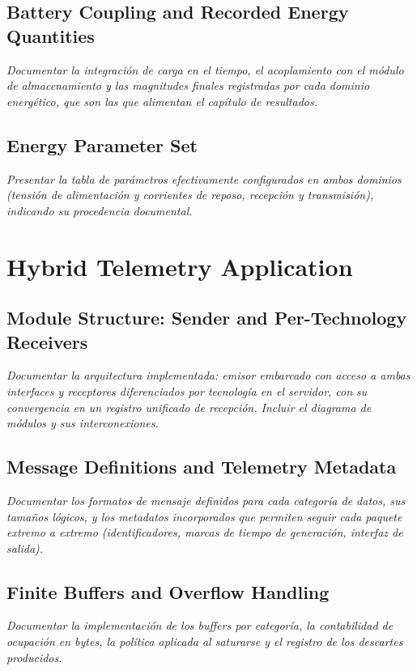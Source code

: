 \subsection{Battery Coupling and Recorded Energy Quantities}
\emph{Documentar la integración de carga en el tiempo, el acoplamiento con el
módulo de almacenamiento y las magnitudes finales registradas por cada dominio
energético, que son las que alimentan el capítulo de resultados.}

\subsection{Energy Parameter Set}
\emph{Presentar la tabla de parámetros efectivamente configurados en ambos
dominios (tensión de alimentación y corrientes de reposo, recepción y
transmisión), indicando su procedencia documental.}

\section{Hybrid Telemetry Application}

\subsection{Module Structure: Sender and Per-Technology Receivers}
\emph{Documentar la arquitectura implementada: emisor embarcado con acceso a
ambas interfaces y receptores diferenciados por tecnología en el servidor, con su
convergencia en un registro unificado de recepción. Incluir el diagrama de
módulos y sus interconexiones.}

\subsection{Message Definitions and Telemetry Metadata}
\emph{Documentar los formatos de mensaje definidos para cada categoría de datos,
sus tamaños lógicos, y los metadatos incorporados que permiten seguir cada
paquete extremo a extremo (identificadores, marcas de tiempo de generación,
interfaz de salida).}

\subsection{Finite Buffers and Overflow Handling}
\emph{Documentar la implementación de los buffers por categoría, la contabilidad
de ocupación en bytes, la política aplicada al saturarse y el registro de los
descartes producidos.}

